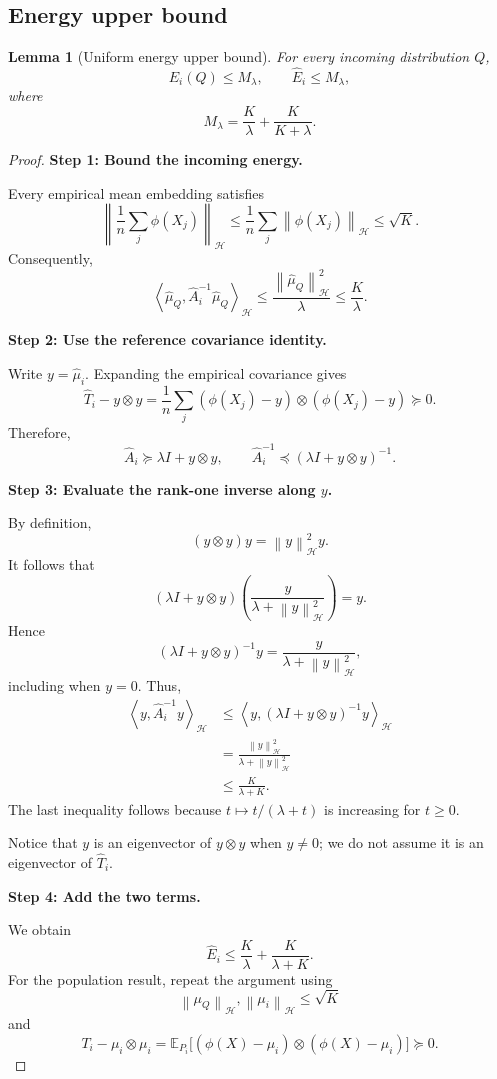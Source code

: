 \documentclass[11pt]{article}
\newcommand{\HH}{\mathcal H}
\newcommand{\E}{\mathbb E}
\newcommand{\inner}[2]{\left\langle #1,#2\right\rangle_{\HH}}
\newcommand{\norm}[1]{\left\lVert #1\right\rVert_{\HH}}
\newcommand{\proofstep}[1]{%
  \par\smallskip
  \noindent\textbf{#1}\enspace\ignorespaces
}
\newtheorem{lemma}{Lemma}
\begin{document}
\subsection{Energy upper bound}

\begin{lemma}[Uniform energy upper bound]
\label{lem:upper}
For every incoming distribution $Q$,
\[
E_i(Q)\le M_\lambda,
\qquad
\widehat E_i\le M_\lambda,
\]
where
\begin{equation}
M_\lambda=\frac K\lambda+\frac K{K+\lambda}.
\label{eq:M}
\end{equation}
\end{lemma}

\begin{proof}
\proofstep{Step 1: Bound the incoming energy.}
Every empirical mean embedding satisfies
\[
\norm{\frac1n\sum_j\phi(X_j)}
\le\frac1n\sum_j\norm{\phi(X_j)}
\le\sqrt K.
\]
Consequently,
\[
\inner{\widehat\mu_Q}
{\widehat A_i^{-1}\widehat\mu_Q}
\le\frac{\norm{\widehat\mu_Q}^2}{\lambda}
\le\frac K\lambda.
\]

\proofstep{Step 2: Use the reference covariance identity.}
Write $y=\widehat\mu_i$.
Expanding the empirical covariance gives
\[
\widehat T_i-y\otimes y
=
\frac1n\sum_j
(\phi(X_j)-y)\otimes(\phi(X_j)-y)
\succeq0.
\]
Therefore,
\[
\widehat A_i\succeq\lambda I+y\otimes y,
\qquad
\widehat A_i^{-1}
\preceq(\lambda I+y\otimes y)^{-1}.
\]

\proofstep{Step 3: Evaluate the rank-one inverse along $y$.}
By definition,
\[
(y\otimes y)y=\norm{y}^2y.
\]
It follows that
\[
(\lambda I+y\otimes y)
\left(\frac{y}{\lambda+\norm{y}^2}\right)=y.
\]
Hence
\[
(\lambda I+y\otimes y)^{-1}y
=\frac{y}{\lambda+\norm{y}^2},
\]
including when $y=0$.
Thus,
\[
\begin{aligned}
\inner{y}{\widehat A_i^{-1}y}
&\le
\inner{y}{(\lambda I+y\otimes y)^{-1}y}\\
&=\frac{\norm{y}^2}{\lambda+\norm{y}^2}\\
&\le\frac K{\lambda+K}.
\end{aligned}
\]
The last inequality follows because
$t\mapsto t/(\lambda+t)$ is increasing for $t\ge0$.

Notice that $y$ is an eigenvector of $y\otimes y$ when
$y\ne0$; we do not assume it is an eigenvector of
$\widehat T_i$.

\proofstep{Step 4: Add the two terms.}
We obtain
\[
\widehat E_i
\le\frac K\lambda+\frac K{\lambda+K}.
\]
For the population result, repeat the argument using
\[
\norm{\mu_Q},\norm{\mu_i}\le\sqrt K
\]
and
\[
T_i-\mu_i\otimes\mu_i
=
\E_{P_i}\big[
(\phi(X)-\mu_i)\otimes(\phi(X)-\mu_i)
\big]\succeq0.
\]
\end{proof}
\end{document}
